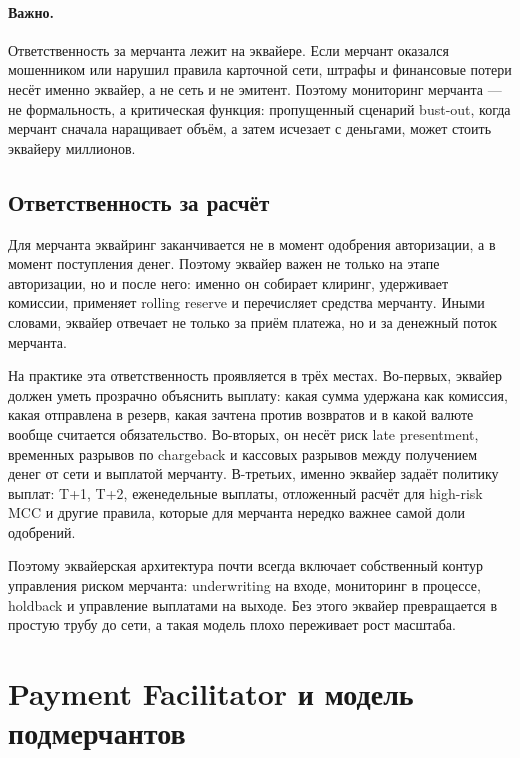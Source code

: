 \paragraph{Важно.}
  Ответственность за мерчанта лежит на эквайере. Если мерчант
  оказался мошенником или нарушил правила карточной сети,
  штрафы и финансовые потери несёт именно эквайер, а не сеть
  и не эмитент. Поэтому мониторинг мерчанта --- не формальность,
  а критическая функция: пропущенный сценарий bust-out, когда
  мерчант сначала наращивает объём, а затем исчезает с деньгами,
  может стоить эквайеру миллионов.\cite{visa-payment-facilitator-marketplace-risk-guide,visa-acceptance-entities}


\subsection*{Ответственность за расчёт}

Для мерчанта эквайринг заканчивается не в момент одобрения
авторизации, а в момент поступления денег. Поэтому эквайер важен
не только на этапе авторизации, но и после него: именно он
собирает клиринг, удерживает комиссии, применяет rolling reserve
и перечисляет средства мерчанту. Иными словами, эквайер отвечает
не только за приём платежа, но и за денежный поток мерчанта.

На практике эта ответственность проявляется в трёх местах.
Во-первых, эквайер должен уметь прозрачно объяснить выплату:
какая сумма удержана как комиссия, какая отправлена в резерв,
какая зачтена против возвратов и в какой валюте вообще считается
обязательство. Во-вторых, он несёт риск late presentment,
временных разрывов по chargeback и кассовых разрывов между
получением денег от сети и выплатой мерчанту. В-третьих, именно
эквайер задаёт политику выплат: T+1, T+2, еженедельные выплаты,
отложенный расчёт для high-risk MCC и другие правила, которые
для мерчанта нередко важнее самой доли одобрений.

Поэтому эквайерская архитектура почти всегда включает собственный
контур управления риском мерчанта: underwriting на входе,
мониторинг в процессе, holdback и управление выплатами
на выходе. Без этого эквайер превращается в простую трубу
до сети, а такая модель плохо переживает рост масштаба.

\section{Payment Facilitator и модель подмерчантов}
\label{sec:ia-payfac}

